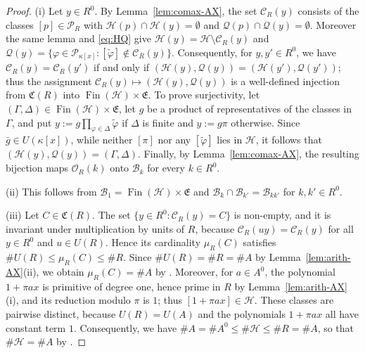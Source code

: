 \documentclass[12pt,reqno,a4paper]{amsart}
\newcommand{\Pe}{\mathcal{P}}
\DeclareMathOperator{\Fin}{Fin}
\theoremstyle{plain}
\theoremstyle{definition}
\begin{document}
\begin{proof}
(i) Let $y\in R^0$. By Lemma~\ref{lem:comax-AX}, the set $\mathcal{C}_R(y)$ consists of the classes $[p]\in\Pe_R$ with $\mathcal{H}(p)\cap\mathcal{H}(y)=\emptyset$ and $\mathcal{Q}(p)\cap\mathcal{Q}(y)=\emptyset$. Moreover the same lemma and \eqref{eq:HQ} give $\mathcal{H}(y)=\mathcal{H}\setminus\mathcal{C}_R(y)$ and $\mathcal{Q}(y)=\{\varphi\in\Pe_{\kappa[x]}:[\tilde\varphi]\notin\mathcal{C}_R(y)\}$. Consequently, for $y,y'\in R^0$, we have $\mathcal{C}_R(y)=\mathcal{C}_R(y')$ if and only if $(\mathcal{H}(y),\mathcal{Q}(y))=(\mathcal{H}(y'),\mathcal{Q}(y'))$; thus the assignment $\mathcal{C}_R(y)\mapsto(\mathcal{H}(y),\mathcal{Q}(y))$ is a well-defined injection from $\mathfrak{C}(R)$ into $\Fin(\mathcal{H})\times\mathfrak{E}$. To prove surjectivity, let $(\Gamma,\Delta)\in\Fin(\mathcal{H})\times\mathfrak{E}$, let $g$ be a product of representatives of the classes in $\Gamma$, and put $y:=g\prod\limits_{\varphi\in\Delta}\tilde\varphi$ if $\Delta$ is finite and $y:=g\pi$ otherwise. Since $\bar g\in U(\kappa[x])$, while neither $[\pi]$ nor any $[\tilde\varphi]$ lies in $\mathcal{H}$, it follows that $(\mathcal{H}(y),\mathcal{Q}(y))=(\Gamma,\Delta)$. Finally, by Lemma~\ref{lem:comax-AX}, the resulting bijection maps $\mathcal{O}_R(k)$ onto $\mathcal{B}_k$ for every $k\in R^0$.

(ii) This follows from $\mathcal{B}_1=\Fin(\mathcal{H})\times\mathfrak{E}$ and $\mathcal{B}_k\cap\mathcal{B}_{k'}=\mathcal{B}_{kk'}$ for $k,k'\in R^0$.

(iii) Let $C\in\mathfrak{C}(R)$. The set $\{y\in R^0:\mathcal{C}_R(y)=C\}$ is non-empty, and it is invariant under multiplication by units of $R$, because $\mathcal{C}_R(uy)=\mathcal{C}_R(y)$ for all $y\in R^0$ and $u\in U(R)$. Hence its cardinality $\mu_R(C)$ satisfies $\#U(R)\leq\mu_R(C)\leq\#R$. Since $\#U(R)=\#R=\#A$ by Lemma~\ref{lem:arith-AX}(ii), we obtain $\mu_R(C)=\#A$ by \cite[Theorem~3.2]{Jech}. Moreover, for $a\in A^0$, the polynomial $1+\pi ax$ is primitive of degree one, hence prime in $R$ by Lemma~\ref{lem:arith-AX}(i), and its reduction modulo $\pi$ is $1$; thus $[1+\pi ax]\in\mathcal{H}$. These classes are pairwise distinct, because $U(R)=U(A)$ and the polynomials $1+\pi ax$ all have constant term $1$. Consequently, we have $\#A=\#A^0\leq\#\mathcal{H}\leq\#R=\#A$, so that $\#\mathcal{H}=\#A$ by \cite[Theorem~3.2]{Jech}.
\end{proof}
\end{document}
